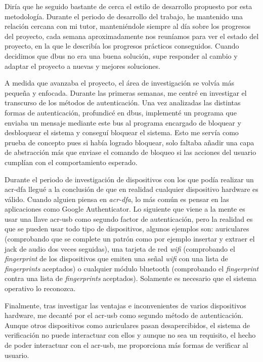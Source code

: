 \documentclass[titlepage, 12pt, a4paper]{article}
\begin{document}
Diría que he seguido bastante de cerca el estilo de desarrollo propuesto por esta metodología. Durante el periodo de desarrollo del trabajo, he mantenido una relación cercana con mi tutor, manteniéndole siempre al día sobre los progresos del proyecto, cada semana aproximadamente nos reuníamos para ver el estado del proyecto, en la que le describía los progresos prácticos conseguidos. Cuando decidimos que \gls{dbus} no era una buena solución, supe responder al cambio y adaptar el proyecto a nuevas y mejores soluciones. \par
A medida que avanzaba el proyecto, el área de investigación se volvía más pequeña y enfocada. Durante las primeras semanas, me centré en investigar el transcurso de los métodos de autenticación. Una vez analizadas las distintas formas de autenticación, profundicé en \gls{dbus}, implementé un programa que enviaba un mensaje mediante este bus al programa encargado de bloquear y desbloquear el sistema y conseguí bloquear el sistema. Esto me servía como prueba de concepto pues si había logrado bloquear, solo faltaba añadir una capa de abstracción más que enviase el comando de bloqueo si las acciones del usuario cumplían con el comportamiento esperado. \par
Durante el periodo de investigación de dispositivos con los que podía realizar un \gls{acr-dfa} llegué a la conclusión de que en realidad cualquier dispositivo hardware es válido. Cuando alguien piensa en \textit{\gls{acr-dfa}}, lo más común es pensar en las aplicaciones como Google Authenticator. Lo siguiente que viene a la mente es usar una llave \gls{acr-usb} como segundo factor de autenticación, pero la realidad es que se pueden usar todo tipo de dispositivos, algunos ejemplos son: auriculares (comprobando que se complete un patrón como por ejemplo insertar y extraer el jack de audio dos veces seguidas), una tarjeta de red \textit{\gls{wifi}} (comprobando  el \textit{\gls{fingerprint}} de los dispositivos que emiten una señal \textit{\gls{wifi}} con una lista de \textit{\gls{fingerprint}s} aceptados) o cualquier módulo \gls{bluetooth} (comprobando el \textit{\gls{fingerprint}} contra una lista de \textit{\gls{fingerprint}s} aceptados). Solamente es necesario que el sistema operativo lo reconozca. \par
Finalmente, tras investigar las ventajas e inconvenientes de varios dispositivos hardware, me decanté por el \gls{acr-usb} como segundo método de autenticación. Aunque otros dispositivos como auriculares pasan desapercibidos, el sistema de verificación no puede interactuar con ellos y aunque no sea un requisito, el hecho de poder interactuar con el \gls{acr-usb}, me proporciona más formas de verificar al usuario.
\clearpage
\end{document}
